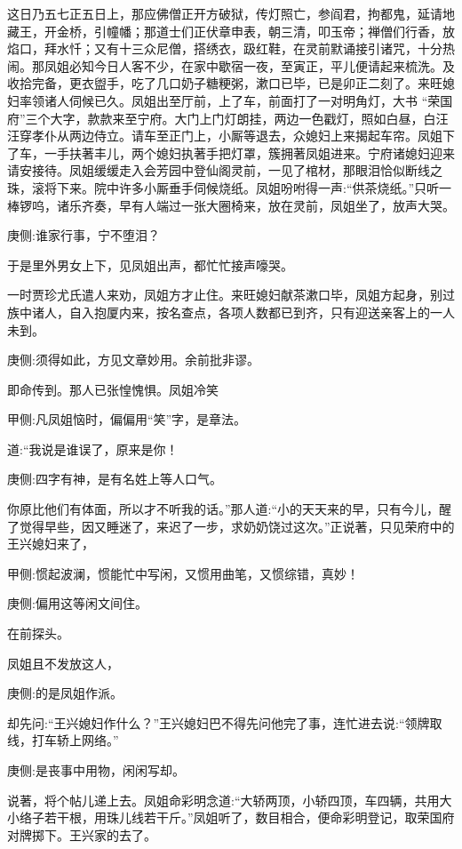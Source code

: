 \begin{parag}
    这日乃五七正五日上，那应佛僧正开方破狱，传灯照亡，参阎君，拘都鬼，延请地藏王，开金桥，引幢幡；那道士们正伏章申表，朝三清，叩玉帝；禅僧们行香，放焰口，拜水忏；又有十三众尼僧，搭绣衣，趿红鞋，在灵前默诵接引诸咒，十分热闹。那凤姐必知今日人客不少，在家中歇宿一夜，至寅正，平儿便请起来梳洗。及收拾完备，更衣盥手，吃了几口奶子糖粳粥，漱口已毕，已是卯正二刻了。来旺媳妇率领诸人伺候已久。凤姐出至厅前，上了车，前面打了一对明角灯，大书 “荣国府”三个大字，款款来至宁府。大门上门灯朗挂，两边一色戳灯，照如白昼，白汪汪穿孝仆从两边侍立。请车至正门上，小厮等退去，众媳妇上来揭起车帘。凤姐下了车，一手扶著丰儿，两个媳妇执著手把灯罩，簇拥著凤姐进来。宁府诸媳妇迎来请安接待。凤姐缓缓走入会芳园中登仙阁灵前，一见了棺材，那眼泪恰似断线之珠，滚将下来。院中许多小厮垂手伺候烧纸。凤姐吩咐得一声:“供茶烧纸。”只听一棒锣呜，诸乐齐奏，早有人端过一张大圈椅来，放在灵前，凤姐坐了，放声大哭。\begin{note}庚侧:谁家行事，宁不堕泪？\end{note}于是里外男女上下，见凤姐出声，都忙忙接声嚎哭。
\end{parag}


\begin{parag}
    一时贾珍尤氏遣人来劝，凤姐方才止住。来旺媳妇献茶漱口毕，凤姐方起身，别过族中诸人，自入抱厦内来，按名查点，各项人数都已到齐，只有迎送亲客上的一人未到。\begin{note}庚侧:须得如此，方见文章妙用。余前批非谬。\end{note}即命传到。那人已张惶愧惧。凤姐冷笑\begin{note}甲侧:凡凤姐恼时，偏偏用“笑”字，是章法。\end{note}道:“我说是谁误了，原来是你！\begin{note}庚侧:四字有神，是有名姓上等人口气。\end{note}你原比他们有体面，所以才不听我的话。”那人道:“小的天天来的早，只有今儿，醒了觉得早些，因又睡迷了，来迟了一步，求奶奶饶过这次。”正说著，只见荣府中的王兴媳妇来了，\begin{note}甲侧:惯起波澜，惯能忙中写闲，又惯用曲笔，又惯综错，真妙！\end{note}\begin{note}庚侧:偏用这等闲文间住。\end{note}在前探头。
\end{parag}


\begin{parag}
    凤姐且不发放这人，\begin{note}庚侧:的是凤姐作派。\end{note}却先问:“王兴媳妇作什么？”王兴媳妇巴不得先问他完了事，连忙进去说:“领牌取线，打车轿上网络。”\begin{note}庚侧:是丧事中用物，闲闲写却。\end{note}说著，将个帖儿递上去。凤姐命彩明念道:“大轿两顶，小轿四顶，车四辆，共用大小络子若干根，用珠儿线若干斤。”凤姐听了，数目相合，便命彩明登记，取荣国府对牌掷下。王兴家的去了。
\end{parag}


